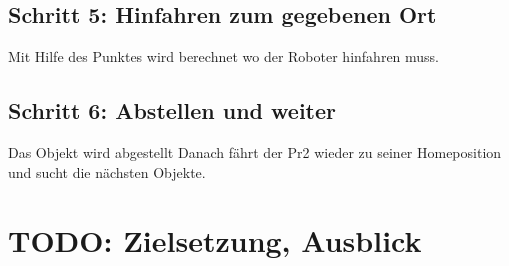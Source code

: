 \documentclass{suturo}
\begin{document}
\subsection*{Schritt 5: Hinfahren zum gegebenen Ort}
Mit Hilfe des Punktes wird berechnet wo der Roboter hinfahren muss. %
 
\subsection*{Schritt 6: Abstellen und weiter}
Das Objekt wird abgestellt %
Danach fährt der Pr2 wieder zu seiner Homeposition und sucht die nächsten Objekte.


\section*{TODO: Zielsetzung, Ausblick}
\end{document}
